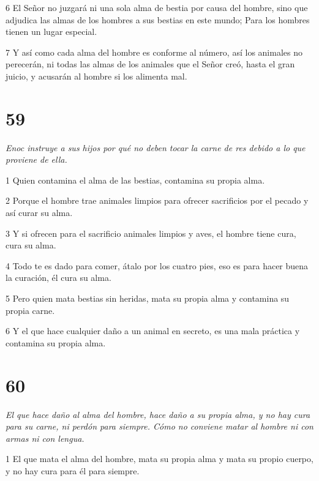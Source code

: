 \par 6 El Señor no juzgará ni una sola alma de bestia por causa del hombre, sino que adjudica las almas de los hombres a sus bestias en este mundo; Para los hombres tienen un lugar especial.

\par 7 Y así como cada alma del hombre es conforme al número, así los animales no perecerán, ni todas las almas de los animales que el Señor creó, hasta el gran juicio, y acusarán al hombre si los alimenta mal.

\chapter{59}

\par \textit{Enoc instruye a sus hijos por qué no deben tocar la carne de res debido a lo que proviene de ella.}

\par 1 Quien contamina el alma de las bestias, contamina su propia alma.

\par 2 Porque el hombre trae animales limpios para ofrecer sacrificios por el pecado y así curar su alma.

\par 3 Y si ofrecen para el sacrificio animales limpios y aves, el hombre tiene cura, cura su alma.

\par 4 Todo te es dado para comer, átalo por los cuatro pies, eso es para hacer buena la curación, él cura su alma.

\par 5 Pero quien mata bestias sin heridas, mata su propia alma y contamina su propia carne.

\par 6 Y el que hace cualquier daño a un animal en secreto, es una mala práctica y contamina su propia alma.

\chapter{60}

\par \textit{El que hace daño al alma del hombre, hace daño a su propia alma, y ​​no hay cura para su carne, ni perdón para siempre. Cómo no conviene matar al hombre ni con armas ni con lengua.}

\par 1 El que mata el alma del hombre, mata su propia alma y mata su propio cuerpo, y no hay cura para él para siempre.

